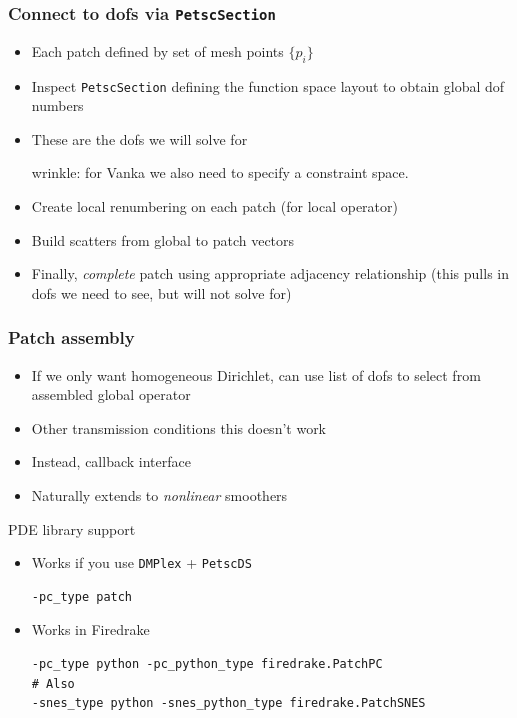 \documentclass[presentation,aspectratio=43,10pt]{beamer}
\begin{document}
\begin{frame}
  \frametitle{Connect to dofs via \texttt{PetscSection}}
  \begin{itemize}
  \item Each patch defined by set of mesh points $\{p_i\}$
  \item Inspect \texttt{PetscSection} defining the function space
    layout to obtain global dof numbers
  \item These are the dofs we will solve for
    \begin{flushright}
      {\small wrinkle: for Vanka we also need to specify a constraint space.}
    \end{flushright}
  \item Create local renumbering on each patch (for local operator)
  \item Build scatters from global to patch vectors
  \item Finally, \emph{complete} patch using appropriate adjacency
    relationship (this pulls in dofs we need to see, but will not
    solve for)
  \end{itemize}
\end{frame}
\begin{frame}[fragile]
  \frametitle{Patch assembly}
  \begin{itemize}
  \item If we only want homogeneous Dirichlet, can use list of dofs to
    select from assembled global operator
  \item Other transmission conditions this doesn't work
  \item Instead, callback interface
  \item Naturally extends to \emph{nonlinear} smoothers
  \end{itemize}

  \begin{block}{PDE library support}
    \begin{itemize}
    \item Works if you use \texttt{DMPlex} + \texttt{PetscDS}
\begin{verbatim}
-pc_type patch
\end{verbatim}
    \item Works in Firedrake
\begin{verbatim}
-pc_type python -pc_python_type firedrake.PatchPC
# Also
-snes_type python -snes_python_type firedrake.PatchSNES
\end{verbatim}
    \end{itemize}
  \end{block}
\end{frame}
\end{document}
